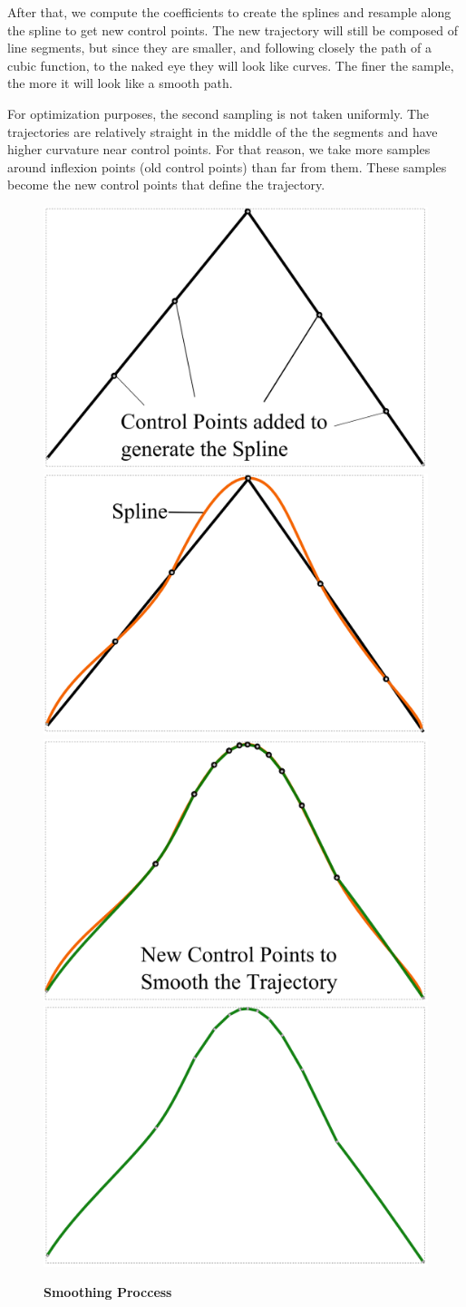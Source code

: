 After that, we compute the coefficients to create the splines and resample along the spline to get new control points. The new trajectory will still be composed of line segments, but since they are smaller, and following closely the path of a cubic function, to the naked eye they will look like curves. The finer the sample, the more it will look like a smooth path.

For optimization purposes, the second sampling is not taken uniformly. The trajectories are relatively straight in the middle of the the segments and have higher curvature near control points. For that reason, we take more samples around inflexion points (old control points) than far from them. These samples become the new control points that define the trajectory.

\begin{figure}[t]
	\begin{center}
	\includegraphics[width=0.48\linewidth]{./images/Smooth1.png}
	\includegraphics[width=0.48\linewidth]{./images/Smooth2.png}\\
	\includegraphics[width=0.48\linewidth]{./images/Smooth3.png}
	\includegraphics[width=0.48\linewidth]{./images/Smooth4.png}
	\caption{
		\textbf{\textbf{Smoothing Proccess}}
	}
	\label{fig:smoothing}
	\end{center}
\end{figure}
